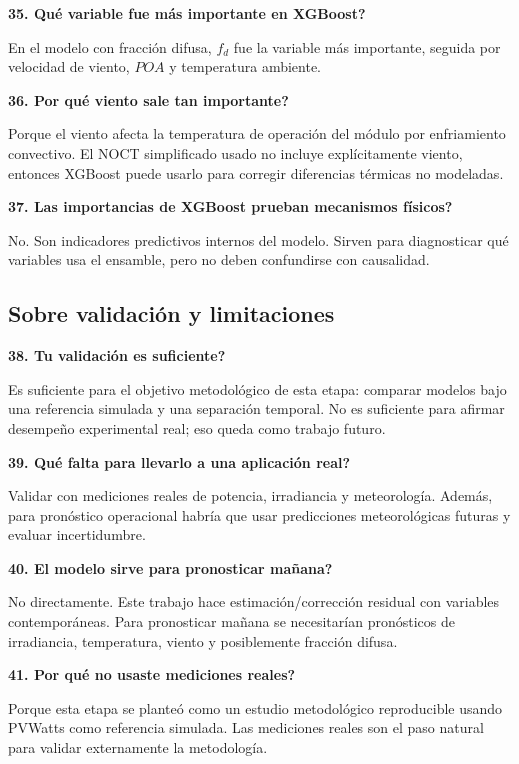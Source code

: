 \documentclass[11pt, letterpaper]{article}
\newcommand{\fd}{f_d}
\begin{document}
\textbf{35. \textquestiondown Qu\'e variable fue m\'as importante en XGBoost?}

En el modelo con fracci\'on difusa, \(\fd\) fue la variable m\'as importante, seguida por velocidad de viento, \(POA\) y temperatura ambiente.

\textbf{36. \textquestiondown Por qu\'e viento sale tan importante?}

Porque el viento afecta la temperatura de operaci\'on del m\'odulo por enfriamiento convectivo. El NOCT simplificado usado no incluye expl\'icitamente viento, entonces XGBoost puede usarlo para corregir diferencias t\'ermicas no modeladas.

\textbf{37. \textquestiondown Las importancias de XGBoost prueban mecanismos f\'isicos?}

No. Son indicadores predictivos internos del modelo. Sirven para diagnosticar qu\'e variables usa el ensamble, pero no deben confundirse con causalidad.

\subsection{Sobre validaci\'on y limitaciones}

\textbf{38. \textquestiondown Tu validaci\'on es suficiente?}

Es suficiente para el objetivo metodol\'ogico de esta etapa: comparar modelos bajo una referencia simulada y una separaci\'on temporal. No es suficiente para afirmar desempe\~no experimental real; eso queda como trabajo futuro.

\textbf{39. \textquestiondown Qu\'e falta para llevarlo a una aplicaci\'on real?}

Validar con mediciones reales de potencia, irradiancia y meteorolog\'ia. Adem\'as, para pron\'ostico operacional habr\'ia que usar predicciones meteorol\'ogicas futuras y evaluar incertidumbre.

\textbf{40. \textquestiondown El modelo sirve para pronosticar ma\~nana?}

No directamente. Este trabajo hace estimaci\'on/correcci\'on residual con variables contempor\'aneas. Para pronosticar ma\~nana se necesitar\'ian pron\'osticos de irradiancia, temperatura, viento y posiblemente fracci\'on difusa.

\textbf{41. \textquestiondown Por qu\'e no usaste mediciones reales?}

Porque esta etapa se plante\'o como un estudio metodol\'ogico reproducible usando PVWatts como referencia simulada. Las mediciones reales son el paso natural para validar externamente la metodolog\'ia.
\end{document}
